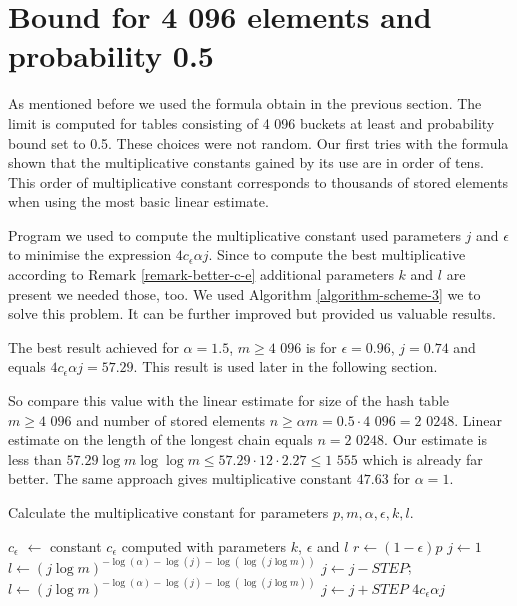 \section{Bound for 4 096 elements and probability 0.5}
As mentioned before we used the formula obtain in the previous section. The limit is computed for tables consisting of 4 096 buckets at least and probability bound set to 0.5. These choices were not random. Our first tries with the formula shown that the multiplicative constants gained by its use are in order of tens. This order of multiplicative constant corresponds to thousands of stored elements when using the most basic linear estimate.

Program we used to compute the multiplicative constant used parameters $j$ and $\epsilon$ to minimise the expression $4 c_\epsilon \alpha j$. Since to compute the best multiplicative according to Remark \ref{remark-better-c-e} additional parameters $k$ and $l$ are present we needed those, too. We used Algorithm \ref{algorithm-scheme-3} we to solve this problem. It can be further improved but provided us valuable results.

The best result achieved for $\alpha = 1.5$, $m \geq \text{4 096}$ is for $\epsilon = 0.96$, $j = 0.74$ and equals $4 c_\epsilon \alpha j = 57.29$. This result is used later in the following section.

So compare this value with the linear estimate for size of the hash table $m \geq \text{4 096}$ and number of stored elements $n \geq \alpha m = 0.5 \cdot \text{4 096} = \text{2 0248}$. Linear estimate on the length of the longest chain equals $n = \text{2 0248}$. Our estimate is less than $57.29 \log m \log \log m \leq 57.29 \cdot 12 \cdot 2.27 \leq \text{1 555}$ which is already far better.  The same approach gives multiplicative constant $47.63$ for $\alpha = 1$.

\begin{algorithm}
\caption{Calculate the multiplicative constant for parameters $p, m, \alpha, \epsilon, k, l$.}
\label{procedure-scheme-3}
\begin{algorithmic}
\STATE $c_\epsilon$ $\leftarrow$ constant $c_\epsilon$ computed with parameters $k$, $\epsilon$ and $l$
\STATE $r \leftarrow (1 - \epsilon)p$ 
\STATE $j \leftarrow 1$
\STATE 
{}
\STATE $l \leftarrow (j \log m) ^ {-\log(\alpha) - \log(j) - \log(\log(j \log m))}$
	\STATE $j \leftarrow j - STEP$;
	\STATE $l \leftarrow (j \log m) ^ {-\log(\alpha) - \log(j) - \log(\log(j \log m))}$
\ENDWHILE
\STATE
\STATE $j \leftarrow j + STEP$
\RETURN $4 c_\epsilon \alpha j$
\end{algorithmic}
\end{algorithm}

